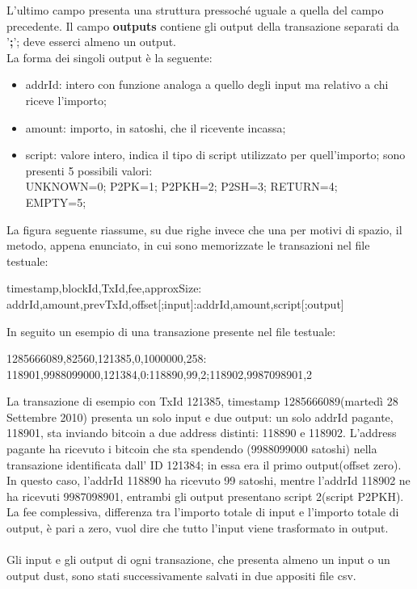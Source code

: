 L'ultimo campo presenta una struttura pressoché uguale a quella del campo precedente.
Il campo \textbf{outputs} contiene gli output della transazione separati da '\textbf{;}'; deve esserci almeno un output.\\
La forma dei singoli output è la seguente:
\begin{itemize}
    \item addrId: intero con funzione analoga a quello degli input ma relativo a chi riceve l'importo; 
    \item amount: importo, in satoshi, che il ricevente incassa;
    \item script: valore intero, indica il tipo di script utilizzato per quell'importo; sono presenti 5 possibili valori: \\UNKNOWN=0; P2PK=1; P2PKH=2; P2SH=3; RETURN=4;\\ EMPTY=5;
\end{itemize}
La figura seguente riassume, su due righe invece che una per motivi di spazio, il metodo, appena enunciato, in cui sono memorizzate le transazioni nel file testuale:
\begin{mdframed}
timestamp,blockId,TxId,fee,approxSize:\\addrId,amount,prevTxId,offset[;input]:addrId,amount,script[;output]
\end{mdframed}
In seguito un esempio di una transazione presente nel file testuale:
\begin{mdframed}
1285666089,82560,121385,0,1000000,258:\\118901,9988099000,121384,0:118890,99,2;118902,9987098901,2
\end{mdframed}
La transazione di esempio con TxId 121385, timestamp 1285666089(martedì 28 Settembre 2010) presenta un solo input e due output: un solo addrId pagante, 118901, sta inviando
bitcoin a due address distinti: 118890 e 118902. L’address pagante
ha ricevuto i bitcoin che sta spendendo (9988099000 satoshi) nella transazione identificata dall' ID 121384; in essa era il primo output(offset zero). In questo caso, l’addrId 118890 ha ricevuto 99 satoshi, mentre l’addrId 118902 ne ha ricevuti 9987098901, entrambi gli output presentano script 2(script P2PKH). La fee complessiva, differenza tra l'importo totale di input e l'importo totale di output, è pari a zero, vuol dire che tutto l'input viene trasformato in output.\\\\
Gli input e gli output di ogni transazione, che presenta almeno un input o un output dust, sono stati successivamente salvati in due appositi file csv.\\
